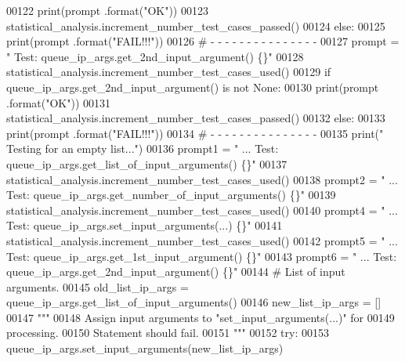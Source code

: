 \begin{DoxyCode}
00122             print(prompt .format(\textcolor{stringliteral}{"OK"}))
00123             statistical\_analysis.increment\_number\_test\_cases\_passed()
00124         \textcolor{keywordflow}{else}:
00125             print(prompt .format(\textcolor{stringliteral}{"FAIL!!!"}))
00126         \textcolor{comment}{#   -   -   -   -   -   -   -   -   -   -   -   -   -   -   -}
00127         prompt = \textcolor{stringliteral}{"  Test: queue\_ip\_args.get\_2nd\_input\_argument()        \{\}"}
00128         statistical\_analysis.increment\_number\_test\_cases\_used()
00129         \textcolor{keywordflow}{if} queue\_ip\_args.get\_2nd\_input\_argument() \textcolor{keywordflow}{is} \textcolor{keywordflow}{not} \textcolor{keywordtype}{None}:
00130             print(prompt .format(\textcolor{stringliteral}{"OK"}))
00131             statistical\_analysis.increment\_number\_test\_cases\_passed()
00132         \textcolor{keywordflow}{else}:
00133             print(prompt .format(\textcolor{stringliteral}{"FAIL!!!"}))
00134         \textcolor{comment}{#   -   -   -   -   -   -   -   -   -   -   -   -   -   -   -}
00135         print(\textcolor{stringliteral}{" Testing for an empty list..."})
00136         prompt1 = \textcolor{stringliteral}{" ... Test: queue\_ip\_args.get\_list\_of\_input\_arguments()   \{\}"}
00137         statistical\_analysis.increment\_number\_test\_cases\_used()
00138         prompt2 = \textcolor{stringliteral}{" ... Test: queue\_ip\_args.get\_number\_of\_input\_arguments() \{\}"}
00139         statistical\_analysis.increment\_number\_test\_cases\_used()
00140         prompt4 = \textcolor{stringliteral}{" ... Test: queue\_ip\_args.set\_input\_arguments(...)    \{\}"}
00141         statistical\_analysis.increment\_number\_test\_cases\_used()
00142         prompt5 = \textcolor{stringliteral}{" ... Test: queue\_ip\_args.get\_1st\_input\_argument()    \{\}"}
00143         prompt6 = \textcolor{stringliteral}{" ... Test: queue\_ip\_args.get\_2nd\_input\_argument()    \{\}"}
00144         \textcolor{comment}{#   List of input arguments.}
00145         old\_list\_ip\_args = queue\_ip\_args.get\_list\_of\_input\_arguments()
00146         new\_list\_ip\_args = []
00147         \textcolor{stringliteral}{"""}
00148 \textcolor{stringliteral}{            Assign input arguments to "set\_input\_arguments(...)" for}
00149 \textcolor{stringliteral}{                processing.}
00150 \textcolor{stringliteral}{            Statement should fail.}
00151 \textcolor{stringliteral}{        """}
00152         \textcolor{keywordflow}{try}:
00153             queue\_ip\_args.set\_input\_arguments(new\_list\_ip\_args)

\end{DoxyCode}
